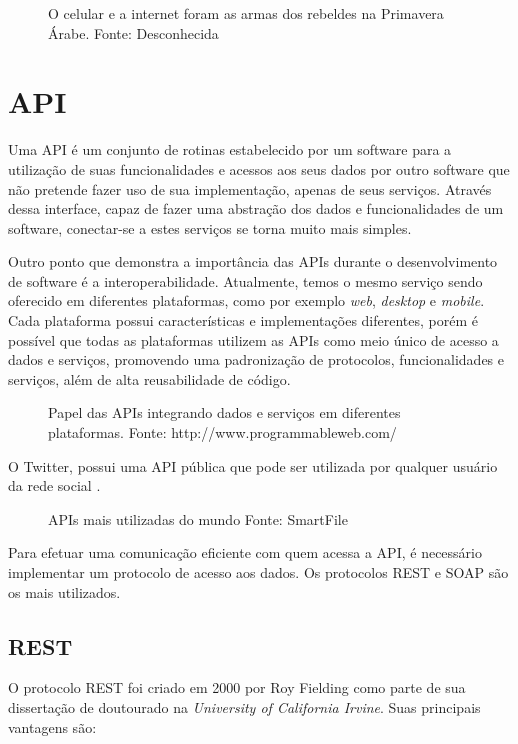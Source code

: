 \begin{figure}[H]
	\centering{}
	\caption{O celular e a internet foram as armas dos rebeldes na Primavera Árabe. Fonte: Desconhecida}
	\label{uni}
\end{figure}

\section{API}\label{sec:api}

Uma API é um conjunto de rotinas estabelecido por um software para a utilização de suas funcionalidades e acessos aos seus dados por outro software que não pretende fazer uso de sua implementação, apenas de seus serviços. Através dessa interface, capaz de fazer uma abstração dos dados e funcionalidades de um software, conectar-se a estes serviços se torna muito mais simples.

Outro ponto que demonstra a importância das APIs durante o desenvolvimento de software é a interoperabilidade. Atualmente, temos o mesmo serviço sendo oferecido em diferentes plataformas, como por exemplo \textit{web}, \textit{desktop} e \textit{mobile}. Cada plataforma possui características e implementações diferentes, porém é possível que todas as plataformas utilizem as APIs como meio único de acesso a dados e serviços, promovendo uma padronização de protocolos, funcionalidades e serviços, além de alta reusabilidade de código.

\begin{figure}[H]
	\centering{}
	\caption{Papel das APIs integrando dados e serviços em diferentes plataformas. Fonte: http://www.programmableweb.com/}
	\label{uni}
\end{figure}

O Twitter, possui uma API pública que pode ser utilizada por qualquer usuário da rede social \cite{twitterapidocs}. 

\begin{figure}[H]
	\centering{}
	\caption{APIs mais utilizadas do mundo Fonte: SmartFile}
	\label{uni}
\end{figure}

Para efetuar uma comunicação eficiente com quem acessa a API, é necessário implementar um protocolo de acesso aos dados. Os protocolos \ac{REST} e \ac{SOAP} são os mais utilizados.

\subsection{REST}
O protocolo REST foi criado em 2000 por Roy Fielding \cite{fieldingrest} como parte de sua dissertação de doutourado na \textit{University of California Irvine}. Suas principais vantagens são:


